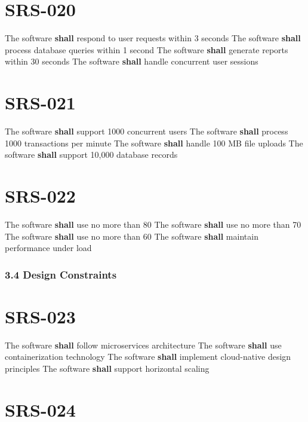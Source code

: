 \section{SRS-020}\label{SRS-020}

The software \textbf{shall} respond to user requests within 3 seconds
The software \textbf{shall} process database queries within 1 second
The software \textbf{shall} generate reports within 30 seconds
The software \textbf{shall} handle concurrent user sessions

\section{SRS-021}\label{SRS-021}

The software \textbf{shall} support 1000 concurrent users
The software \textbf{shall} process 1000 transactions per minute
The software \textbf{shall} handle 100 MB file uploads
The software \textbf{shall} support 10,000 database records

\section{SRS-022}\label{SRS-022}

The software \textbf{shall} use no more than 80%
The software \textbf{shall} use no more than 70%
The software \textbf{shall} use no more than 60%
The software \textbf{shall} maintain performance under load

\subsubsection{3.4 Design Constraints}

\section{SRS-023}\label{SRS-023}

The software \textbf{shall} follow microservices architecture
The software \textbf{shall} use containerization technology
The software \textbf{shall} implement cloud-native design principles
The software \textbf{shall} support horizontal scaling

\section{SRS-024}\label{SRS-024}

